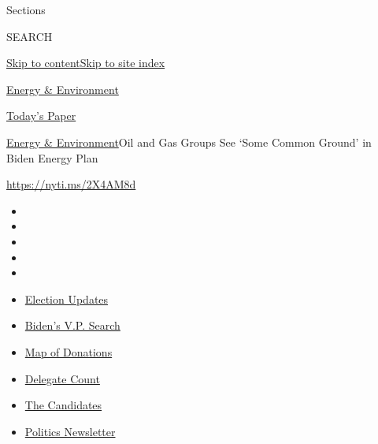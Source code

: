 Sections

SEARCH

\protect\hyperlink{site-content}{Skip to
content}\protect\hyperlink{site-index}{Skip to site index}

\href{https://www.nytimes3xbfgragh.onion/section/business/energy-environment}{Energy
\& Environment}

\href{https://myaccount.nytimes3xbfgragh.onion/auth/login?response_type=cookie\&client_id=vi}{}

\href{https://www.nytimes3xbfgragh.onion/section/todayspaper}{Today's
Paper}

\href{/section/business/energy-environment}{Energy \&
Environment}\textbar{}Oil and Gas Groups See `Some Common Ground' in
Biden Energy Plan

\href{https://nyti.ms/2X4AM8d}{https://nyti.ms/2X4AM8d}

\begin{itemize}
\item
\item
\item
\item
\item
\end{itemize}

\begin{itemize}
\item
  \href{https://www.nytimes3xbfgragh.onion/2020/07/31/us/elections/biden-vs-trump.html?action=click\&pgtype=Article\&state=default\&region=TOP_BANNER\&context=storylines_menu}{Election
  Updates}
\item
  \href{https://www.nytimes3xbfgragh.onion/article/biden-vice-president-2020.html?action=click\&pgtype=Article\&state=default\&region=TOP_BANNER\&context=storylines_menu}{Biden's
  V.P. Search}
\item
  \href{https://www.nytimes3xbfgragh.onion/interactive/2020/07/24/us/politics/trump-biden-campaign-donors.html?action=click\&pgtype=Article\&state=default\&region=TOP_BANNER\&context=storylines_menu}{Map
  of Donations}
\item
  \href{https://www.nytimes3xbfgragh.onion/interactive/2020/us/elections/delegate-count-primary-results.html?action=click\&pgtype=Article\&state=default\&region=TOP_BANNER\&context=storylines_menu}{Delegate
  Count}
\item
  \href{https://www.nytimes3xbfgragh.onion/interactive/2019/us/politics/2020-presidential-candidates.html?action=click\&pgtype=Article\&state=default\&region=TOP_BANNER\&context=storylines_menu}{The
  Candidates}
\item
  \href{https://www.nytimes3xbfgragh.onion/newsletters/politics?action=click\&pgtype=Article\&state=default\&region=TOP_BANNER\&context=storylines_menu}{Politics
  Newsletter}
\end{itemize}

